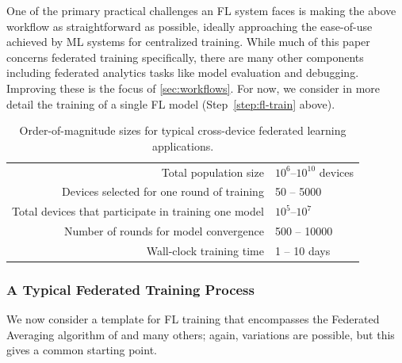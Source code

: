 One of the primary practical challenges an FL system faces is making the above workflow as straightforward as possible, ideally approaching the ease-of-use achieved by ML systems for centralized training. While much of this paper concerns federated training specifically, there are many other components including federated analytics tasks like model evaluation and debugging. Improving these is the focus of \cref{sec:workflows}. For now, we consider in more detail the training of a single FL model (Step~\ref{step:fl-train} above).



\begin{table}
\centering
\renewcommand{\arraystretch}{1.2}
\begin{tabular}{rl}    
\toprule
Total population size                           & $10^6$--$10^{10}$ devices \\
Devices selected for one round of training      & 50 -- 5000 \\
Total devices that participate in training one model  & $10^5$--$10^7$ \\
Number of rounds for model convergence          & 500 -- 10000 \\
Wall-clock training time                        & 1 -- 10 days \\
\bottomrule
\end{tabular}
\caption{Order-of-magnitude sizes for typical cross-device federated learning applications.}
\label{tab:sizes}
\end{table}

\subsubsection{A Typical Federated Training Process}\label{sec:typical-training}
We now consider a template for FL training that encompasses the Federated Averaging algorithm of \citet{mcmahan17fedavg} and many others; again, variations are possible, but this gives a common starting point. 


